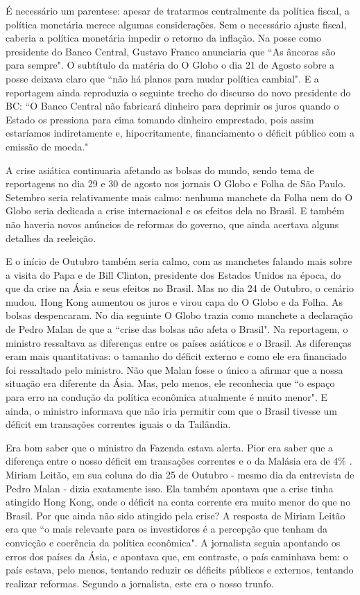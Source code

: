 \documentclass{article}
\begin{document}
É necessário um parentese: apesar de tratarmos centralmente da política fiscal, a política monetária merece algumas considerações. Sem o necessário ajuste fiscal, caberia a política monetária impedir o retorno da inflação. Na posse como presidente do Banco Central, Gustavo Franco anunciaria que ``As âncoras são para sempre". O subtítulo da matéria do O Globo o dia 21 de Agosto sobre a posse deixava claro que ``não há planos para mudar política cambial". E a reportagem ainda reproduzia o seguinte trecho do discurso do novo presidente do BC: ``O Banco Central não fabricará dinheiro para deprimir os juros quando o Estado os pressiona para cima tomando dinheiro emprestado, pois assim estaríamos indiretamente e, hipocritamente, financiamento o déficit público com a emissão de moeda." %

A crise asiática continuaria afetando as bolsas do mundo, sendo tema de reportagens no dia 29 e 30 de agosto nos jornais O Globo e Folha de São Paulo. Setembro seria relativamente mais calmo: nenhuma manchete da Folha nem do O Globo seria dedicada a crise internacional e os efeitos dela no Brasil. E também não haveria novos anúncios de reformas do governo, que ainda acertava alguns detalhes da reeleição.

E o início de Outubro também seria calmo, com as manchetes falando mais sobre a visita do Papa e de Bill Clinton, presidente dos Estados Unidos na época, do que da crise na Ásia e seus efeitos no Brasil. Mas no dia 24 de Outubro, o cenário mudou. Hong Kong aumentou os juros e virou capa do O Globo e da Folha. As bolsas despencaram. No dia seguinte O Globo trazia como manchete a declaração de Pedro Malan de que a ``crise das bolsas não afeta o Brasil". Na reportagem, o ministro ressaltava as diferenças entre os países asiáticos e o Brasil. As diferenças eram mais quantitativas: o tamanho do déficit externo e como ele era financiado foi ressaltado pelo ministro. Não que  Malan fosse o único a afirmar que a nossa situação era diferente da Ásia. Mas, pelo menos, ele reconhecia que ``o espaço para erro na condução da política econômica atualmente é muito menor". E ainda, o ministro informava que não iria permitir com que o Brasil tivesse um déficit em transações correntes iguais o da Tailândia.        
 
Era bom saber que o ministro da Fazenda estava alerta. Pior era saber que a diferença entre o nosso déficit em transações correntes e o da Malásia era de 4\% . Miriam Leitão, em sua coluna do dia 25 de Outubro - mesmo dia da entrevista de Pedro Malan - dizia exatamente isso. Ela também apontava que a crise tinha atingido Hong Kong, onde o déficit na conta corrente era muito menor do que no Brasil. Por que ainda não sido atingido pela crise? A resposta de Miriam Leitão era que ``o mais relevante para os investidores é a percepção que tenham da convicção e coerência da política econômica". A jornalista seguia apontando os erros dos países da Ásia, e apontava que, em contraste, o país caminhava bem: o país estava, pelo menos, tentando reduzir os déficits públicos e externos, tentando realizar reformas. Segundo a jornalista, este era o nosso trunfo. 
\end{document}
